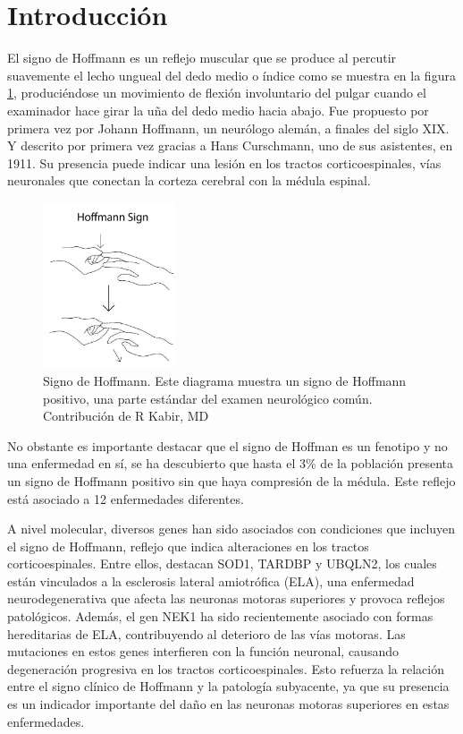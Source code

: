 \section{Introducción}
El signo de Hoffmann es un reflejo muscular que se produce al percutir suavemente el lecho ungueal del dedo medio o índice como se muestra en la figura \ref{fig:Hoffman_sign}, produciéndose un movimiento de flexión involuntario del pulgar cuando el examinador hace girar la uña del dedo medio hacia abajo. Fue propuesto por primera vez por Johann Hoffmann, un neurólogo alemán, a finales del siglo XIX. Y descrito por primera vez gracias a Hans Curschmann, uno de sus asistentes, en 1911\cite{ BENDHEIM}. Su presencia puede indicar una lesión en los tractos corticoespinales, vías neuronales que conectan la corteza cerebral con la médula espinal. 


\begin{figure}[h!]
	\includegraphics[width=0.35\textwidth]{figures/Kabir_Hoffmann__Sign.jpg}
	\caption{Signo de Hoffmann. Este diagrama muestra un signo de Hoffmann positivo, una parte estándar del examen neurológico común. Contribución de R Kabir, MD}
	\label{fig:Hoffman_sign}
\end{figure}


No obstante es importante destacar que el signo de Hoffman es un fenotipo y no una enfermedad en sí, se ha descubierto que hasta el 3\% de la población presenta un signo de Hoffmann positivo sin que haya compresión de la médula. Este reflejo está asociado a 12 enfermedades diferentes\cite{whitney}.


A nivel molecular, diversos genes han sido asociados con condiciones que incluyen el signo de Hoffmann, reflejo que indica alteraciones en los tractos corticoespinales. Entre ellos, destacan SOD1, TARDBP y UBQLN2, los cuales están vinculados a la esclerosis lateral amiotrófica (ELA), una enfermedad neurodegenerativa que afecta las neuronas motoras superiores y provoca reflejos patológicos. Además, el gen NEK1 ha sido recientemente asociado con formas hereditarias de ELA, contribuyendo al deterioro de las vías motoras. Las mutaciones en estos genes interfieren con la función neuronal, causando degeneración progresiva en los tractos corticoespinales. Esto refuerza la relación entre el signo clínico de Hoffmann y la patología subyacente, ya que su presencia es un indicador importante del daño en las neuronas motoras superiores en estas enfermedades.